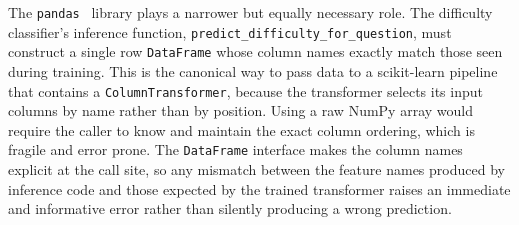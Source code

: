 The \texttt{pandas}~\cite{mckinney2010pandas} library plays a narrower but equally necessary role. The difficulty classifier's inference function, \texttt{predict\_difficulty\_for\_question}, must construct a single row \texttt{DataFrame} whose column names exactly match those seen during training. This is the canonical way to pass data to a scikit-learn pipeline that contains a \texttt{ColumnTransformer}, because the transformer selects its input columns by name rather than by position. Using a raw NumPy array would require the caller to know and maintain the exact column ordering, which is fragile and error prone. The \texttt{DataFrame} interface makes the column names explicit at the call site, so any mismatch between the feature names produced by inference code and those expected by the trained transformer raises an immediate and informative error rather than silently producing a wrong prediction.